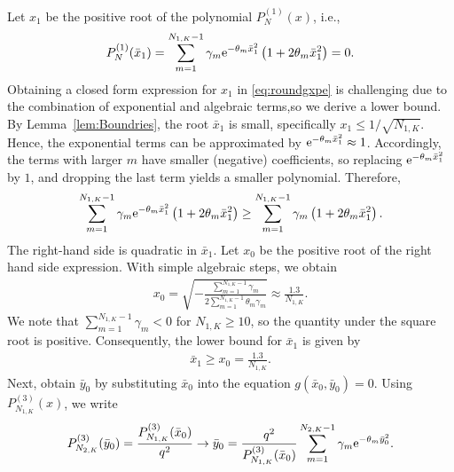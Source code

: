 \documentclass[journal,12pt,onecolumn,draftclsnofoot]{IEEEtran}
\theoremstyle{definition}
\begin{document}
Let $x_1$ be the positive root of the polynomial $P_N^{(1)}(x)$, i.e., 
\begin{align}
P_N^{(1)}(\bar{x}_1)= \sum_{m=1}^{N_{1, K}-1} \gamma_{m} {\rm e}^{-\theta_{m}\bar{x}_1^{2}}\left( 1+2\theta_{m}\bar{x}_1^2\right)=0. \label{eq:roundgxpe}
\end{align}
Obtaining a closed form expression for $x_1$ in \eqref{eq:roundgxpe} is challenging due to the combination of exponential and algebraic terms,so we derive a lower bound.  By Lemma~\ref{lem:Boundries},  the root $\bar{x}_1$ is small, specifically  $x_1 \leq 1/\sqrt{N_{1, K}}$. Hence, the exponential terms can be approximated by  ${\rm e}^{-\theta_{m}\bar{x}_1^{2}} \approx 1$. Accordingly, the terms with larger $m$ have smaller (negative) coefficients, so replacing ${\rm e}^{-\theta_{m}\bar{x}_1^{2}}$ by $1$, and dropping the last term yields a smaller polynomial. Therefore,
\begin{align}
\sum_{m=1}^{N_{1, K}-1} \gamma_{m} {\rm e}^{-\theta_{m}\bar{x}_1^{2}}\left( 1+2\theta_{m}\bar{x}_1^2\right) \geq  \sum_{m=1}^{N_{1, K}-1} \gamma_{m} \left( 1+2\theta_{m}\bar{x}_1^2\right).
\end{align}
 The right-hand side is quadratic in $\bar{x}_1$.   Let $x_0$ be the positive root of the right hand side expression. With simple algebraic steps, we obtain 
 \begin{align}
     x_0 = \sqrt{-\frac{\sum_{m=1}^{N_{1, K}-1}\gamma_m}{2\sum_{m=1}^{N_{1, K}-1}\theta_m\gamma_m}} \approx \frac{1.3}{N_{1, K}}. 
 \end{align}
We note that $\sum_{m=1}^{N_{1,K}-1}\gamma_m <0 $ for $N_{1, K} \geq 10$,  so the quantity under the square root is positive. Consequently, the lower bound for  $\bar{x}_1$ is given by
\begin{align}
   \label{eq:simplexbar}
    \bar{x}_1 \geq x_0 = \frac{1.3}{N_{1, K}}. 
\end{align}
Next,  obtain $\bar{y}_0$ by substituting $\bar{x}_0$ into
the equation $g(\bar{x}_0,\bar{y}_0)= 0$. Using  $P_{N_{1, K}}^{(3)}(x)$, we write  
\begin{align}
    \nonumber
    P_{N_{2, K}}^{(3)}(\bar{y}_0)  = \frac{P_{N_{1, K}}^{(3)}(\bar{x}_0)}{q^2}\rightarrow
    \bar{y}_0  = \frac{q^2}{P_{N_{1, K}}^{(3)}(\bar{x}_0)} \sum_{m=1}^{N_{2, K}-1}\gamma_{m}{\rm e}^{-\theta_{m}\bar{y}_0^{2}}.
\end{align}
\end{document}
